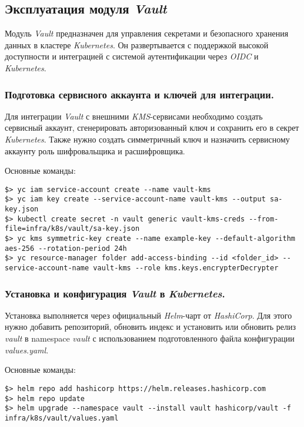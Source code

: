 \subsection{Эксплуатация модуля \textit{Vault}}

Модуль \textit{Vault} предназначен для управления секретами и безопасного хранения данных в кластере \textit{Kubernetes}. Он развертывается с поддержкой высокой доступности и интеграцией с системой аутентификации через \textit{OIDC} и \textit{Kubernetes}.

\subsubsection{Подготовка сервисного аккаунта и ключей для интеграции.} Для интеграции \textit{Vault} с внешними \textit{KMS}-сервисами необходимо создать сервисный аккаунт, сгенерировать авторизованный ключ и сохранить его в секрет \textit{Kubernetes}. Также нужно создать симметричный ключ и назначить сервисному аккаунту роль шифровальщика и расшифровщика.

Основные команды:

\begin{lstlisting}
$> yc iam service-account create --name vault-kms
$> yc iam key create --service-account-name vault-kms --output sa-key.json
$> kubectl create secret -n vault generic vault-kms-creds --from-file=infra/k8s/vault/sa-key.json
$> yc kms symmetric-key create --name example-key --default-algorithm aes-256 --rotation-period 24h
$> yc resource-manager folder add-access-binding --id <folder_id> --service-account-name vault-kms --role kms.keys.encrypterDecrypter
\end{lstlisting}

\subsubsection{Установка и конфигурация \textit{Vault} в \textit{Kubernetes}.} Установка выполняется через официальный \textit{Helm}-чарт от \textit{HashiCorp}. Для этого нужно добавить репозиторий, обновить индекс и установить или обновить релиз \textit{vault} в namespace \textit{vault} с использованием подготовленного файла конфигурации \textit{values.yaml}.

Основные команды:

\begin{lstlisting}
$> helm repo add hashicorp https://helm.releases.hashicorp.com
$> helm repo update
$> helm upgrade --namespace vault --install vault hashicorp/vault -f infra/k8s/vault/values.yaml
\end{lstlisting}


